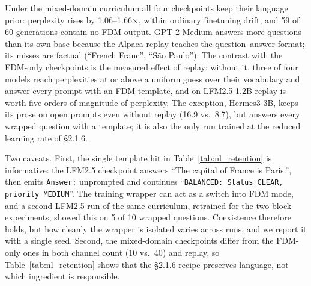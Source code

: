 Under the mixed-domain curriculum all four checkpoints keep their language prior: perplexity rises by
1.06--1.66$\times$, within ordinary finetuning drift, and 59 of 60 generations contain no FDM output.
GPT-2 Medium answers more questions than its own base because the Alpaca replay teaches the
question--answer format; its misses are factual (``French Franc'', ``S\~ao Paulo''). The contrast with the
FDM-only checkpoints is the measured effect of replay: without it, three of four models reach perplexities
at or above a uniform guess over their vocabulary and answer every prompt with an FDM template, and on
LFM2.5-1.2B replay is worth five orders of magnitude of perplexity. The exception, Hermes3-3B, keeps its
prose on open prompts even without replay (16.9 vs.\ 8.7), but answers every wrapped question with a
template; it is also the only run trained at the reduced learning rate of \S2.1.6.

Two caveats. First, the single template hit in Table~\ref{tab:nl_retention} is informative: the LFM2.5
checkpoint answers ``The capital of France is Paris.'', then emits \texttt{Answer:} unprompted and
continues ``\texttt{BALANCED: Status CLEAR, priority MEDIUM}''. The training wrapper can act as a switch
into FDM mode, and a second LFM2.5 run of the same curriculum, retrained for the two-block experiments,
showed this on 5 of 10 wrapped questions. Coexistence therefore holds, but how cleanly the wrapper is
isolated varies across runs, and we report it with a single seed. Second, the mixed-domain checkpoints
differ from the FDM-only ones in both channel count (10 vs.\ 40) and replay, so Table~\ref{tab:nl_retention}
shows that the \S2.1.6 recipe preserves language, not which ingredient is responsible.
